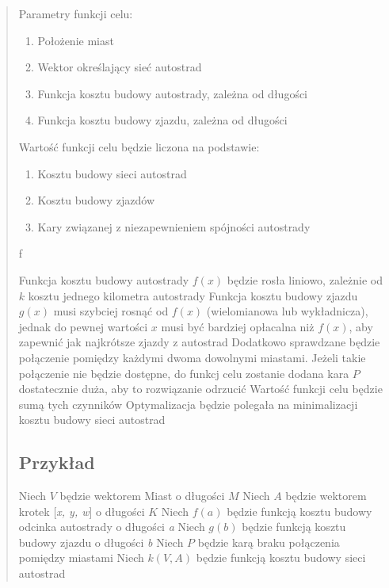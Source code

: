 \documentclass[a4paper]{article}
\begin{document}
\begin{quote}
Parametry funkcji celu:
\begin{enumerate}
\item Położenie miast
\item Wektor określający sieć autostrad
\item Funkcja kosztu budowy autostrady, zależna od długości
\item Funkcja kosztu budowy zjazdu, zależna od długości 
\end{enumerate}

Wartość funkcji celu będzie liczona na podstawie:
\begin{enumerate}
\item Kosztu budowy sieci autostrad
\item Kosztu budowy zjazdów
\item Kary związanej z niezapewnieniem spójności autostrady
\end{enumerate}f

Funkcja kosztu budowy autostrady ${f(x)}$ będzie rosła liniowo, zależnie od ${k}$ kosztu jednego kilometra autostrady\newline
Funkcja kosztu budowy zjazdu ${g(x)}$ musi szybciej rosnąć od ${f(x)}$ (wielomianowa lub wykładnicza), jednak do pewnej wartości ${x}$ musi być bardziej opłacalna niż ${f(x)}$, aby zapewnić jak najkrótsze zjazdy z autostrad\newline
Dodatkowo sprawdzane będzie połączenie pomiędzy każdymi dwoma dowolnymi miastami. Jeżeli takie połączenie nie będzie dostępne, do funkcj celu zostanie dodana kara ${P}$ dostatecznie duża, aby to rozwiązanie odrzucić\newline
Wartość funkcji celu będzie sumą tych czynników\newline
Optymalizacja będzie polegała na minimalizacji kosztu budowy sieci autostrad

\subsection{Przykład}
Niech ${V}$ będzie wektorem Miast o długości ${M}$\newline
Niech ${A}$ będzie wektorem krotek [\textit{x, y, w}] o długości ${K}$\newline
Niech ${f(a)}$ będzie funkcją kosztu budowy odcinka autostrady o długości \textit{a}\newline
Niech ${g(b)}$ będzie funkcją kosztu budowy zjazdu o długości \textit{b}\newline
Niech ${P}$ będzie karą braku połączenia pomiędzy miastami\newline
Niech ${k(V, A)}$ będzie funkcją kosztu budowy sieci autostrad\newline


\end{quote}
\end{document}
